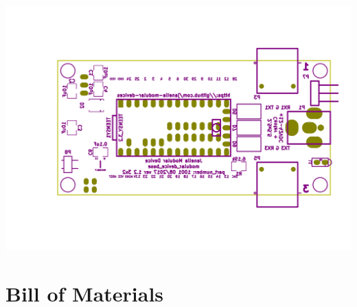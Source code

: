 \documentclass[11pt]{article}
\begin{document}
\begin{center}
\includegraphics[width=.9\linewidth]{./gerbers/images/gerbers01.png}
\end{center}


\section{Bill of Materials}
\label{sec:org9f48678}
\end{document}
